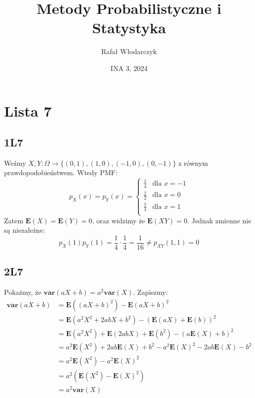 \documentclass{article}
\title{Metody Probabilistyczne i Statystyka}
\author{Rafał Włodarczyk}
\date{INA 3, 2024}
\begin{document}
\maketitle

\tableofcontents

\newpage

\section{Lista 7}

\subsection{1L7}

Weźmy $X,Y:\Omega\rightarrow\{(0,1),(1,0),(-1,0),(0,-1)\}$ z równym prawdopodobieństwem. Wtedy PMF:
\[
p_X(x) = p_Y(x) = \begin{cases}
    \frac{1}{4} & \text{dla } x = -1\\
    \frac{1}{2} & \text{dla } x = 0\\
    \frac{1}{4} & \text{dla } x = 1\\
\end{cases}
\]
Zatem $\mathbf{E}(X) = \mathbf{E}(Y) = 0$, oraz widzimy że $\mathbf{E}(XY) = 0$. Jednak zmienne nie są niezależne:
\[
    p_X(1)p_Y(1) = \frac{1}{4} \cdot \frac{1}{4} = \frac{1}{16} \neq p_{XY}(1,1) = 0
\]

\subsection{2L7}

Pokażmy, że $\mathbf{var}(aX+b) = a^2 \mathbf{var}(X)$. Zapiszmy:
\setcounter{equation}{0}
\begin{align}
    \mathbf{var}(aX+b) &= \mathbf{E}((aX+b)^2) - \mathbf{E}(aX+b)^2\\
    &= \mathbf{E}(a^2X^2+2abX+b^2) - (\mathbf{E}(aX)+\mathbf{E}(b))^2\\
    &= \mathbf{E}(a^2X^2)+\mathbf{E}(2abX)+\mathbf{E}(b^2) - (a\mathbf{E}(X)+b)^2\\
    &= a^2\mathbf{E}(X^2)+2ab\mathbf{E}(X)+b^2 - a^2\mathbf{E}(X)^2-2ab\mathbf{E}(X)-b^2\\
    &= a^2\mathbf{E}(X^2)-a^2\mathbf{E}(X)^2\\
    &= a^2(\mathbf{E}(X^2)-\mathbf{E}(X)^2)\\
    &= a^2\mathbf{var}(X)
\end{align}
\end{document}
